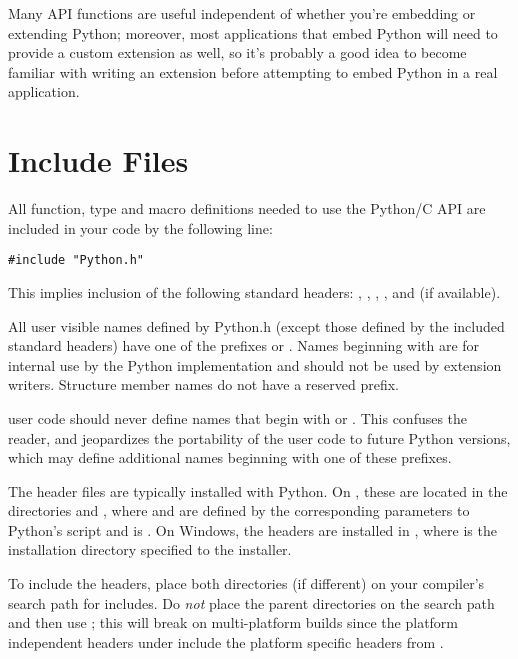 \documentclass{manual}
\begin{document}
Many API functions are useful independent of whether you're embedding 
or extending Python; moreover, most applications that embed Python 
will need to provide a custom extension as well, so it's probably a 
good idea to become familiar with writing an extension before 
attempting to embed Python in a real application.


\section{Include Files \label{includes}}

All function, type and macro definitions needed to use the Python/C
API are included in your code by the following line:

\begin{verbatim}
#include "Python.h"
\end{verbatim}

This implies inclusion of the following standard headers:
, , ,
, and  (if available).

All user visible names defined by Python.h (except those defined by
the included standard headers) have one of the prefixes  or
.  Names beginning with  are for internal use by
the Python implementation and should not be used by extension writers.
Structure member names do not have a reserved prefix.

 user code should never define names that begin
with  or .  This confuses the reader, and
jeopardizes the portability of the user code to future Python
versions, which may define additional names beginning with one of
these prefixes.

The header files are typically installed with Python.  On \UNIX, these 
are located in the directories
 and
, where
 and  are defined by the
corresponding parameters to Python's  script and
 is .  On Windows, the headers are
installed in , where  is
the installation directory specified to the installer.

To include the headers, place both directories (if different) on your
compiler's search path for includes.  Do \emph{not} place the parent
directories on the search path and then use
; this will break on
multi-platform builds since the platform independent headers under
 include the platform specific headers from
.
\end{document}
